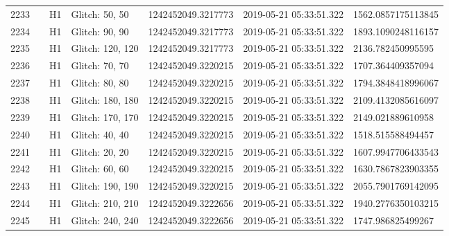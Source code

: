 \begin{longtable}{lllllll}
2233 &                                                    &       H1 &    Glitch: 50, 50 &  1242452049.3217773 &  2019-05-21 05:33:51.322 &  1562.0857175113845 \\
2234 &                                                    &       H1 &    Glitch: 90, 90 &  1242452049.3217773 &  2019-05-21 05:33:51.322 &  1893.1090248116157 \\
2235 &                                                    &       H1 &  Glitch: 120, 120 &  1242452049.3217773 &  2019-05-21 05:33:51.322 &   2136.782450995595 \\
2236 &                                                    &       H1 &    Glitch: 70, 70 &  1242452049.3220215 &  2019-05-21 05:33:51.322 &   1707.364409357094 \\
2237 &                                                    &       H1 &    Glitch: 80, 80 &  1242452049.3220215 &  2019-05-21 05:33:51.322 &  1794.3848418996067 \\
2238 &                                                    &       H1 &  Glitch: 180, 180 &  1242452049.3220215 &  2019-05-21 05:33:51.322 &  2109.4132085616097 \\
2239 &                                                    &       H1 &  Glitch: 170, 170 &  1242452049.3220215 &  2019-05-21 05:33:51.322 &   2149.021889610958 \\
2240 &                                                    &       H1 &    Glitch: 40, 40 &  1242452049.3220215 &  2019-05-21 05:33:51.322 &   1518.515588494457 \\
2241 &                                                    &       H1 &    Glitch: 20, 20 &  1242452049.3220215 &  2019-05-21 05:33:51.322 &  1607.9947706433543 \\
2242 &                                                    &       H1 &    Glitch: 60, 60 &  1242452049.3220215 &  2019-05-21 05:33:51.322 &  1630.7867823903355 \\
2243 &                                                    &       H1 &  Glitch: 190, 190 &  1242452049.3220215 &  2019-05-21 05:33:51.322 &  2055.7901769142095 \\
2244 &                                                    &       H1 &  Glitch: 210, 210 &  1242452049.3222656 &  2019-05-21 05:33:51.322 &  1940.2776350103215 \\
2245 &                                                    &       H1 &  Glitch: 240, 240 &  1242452049.3222656 &  2019-05-21 05:33:51.322 &   1747.986825499267 \\

\end{longtable}
